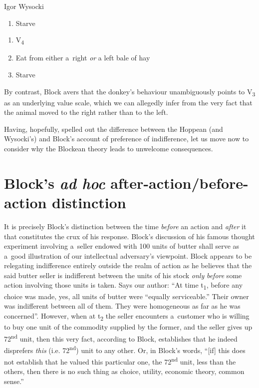 \begin{artengenv}{Igor Wysocki}
\begin{enumerate}[label=(\arabic*)]
\item Starve

\end{enumerate}

\begin{enumerate}[label=(\arabic*)]
\item[]\makebox[-1.7em][l]{}V\textsubscript{4}
\item Eat from either a~right \textit{or} a left bale of hay
\item Starve
\end{enumerate}

By contrast, Block avers that the donkey's behaviour unambiguously points to V\textsubscript{3} as an underlying value scale, which we can allegedly infer from the very fact that the animal moved to the right rather than to the left.



Having, hopefully, spelled out the difference between the Hoppean (and Wysocki's) and Block's account of preference of indifference, let us move now to consider why the Blockean theory leads to unwelcome consequences.



\section{Block's \textit{ad hoc} after-action/before-action distinction }

It is precisely Block's distinction between the time \textit{before} an action and \textit{after} it that constitutes the crux of his response. Block's 
\parencite*[][p.52]{block_response_2022} %
 discussion of his famous thought experiment involving a~seller endowed with 100 units of butter shall serve as a~good illustration of our intellectual adversary's viewpoint. Block appears to be relegating indifference entirely outside the realm of action as he believes that the said butter seller is indifferent between the units of his stock \textit{only} \textit{before} some action involving those units is taken. Says our author: ``At time t\textsubscript{1}, before any choice was made, yes, all units of butter were ``equally serviceable.'' Their owner was indifferent between all of them. They were homogeneous as far as he was concerned''. However, when at t\textsubscript{2} the seller encounters a~customer who is willing to buy one unit of the commodity supplied by the former, and the seller gives up 72\textsuperscript{nd }unit, then this very fact, according to Block, establishes that he indeed disprefers \textit{this} (i.e. 72\textsuperscript{nd}) unit to any other. Or, in Block's words, ``[if] this does not establish that he valued this particular one, the 72\textsuperscript{nd} unit, less than the others, then there is no such thing as choice, utility, economic theory, common sense.''




\end{artengenv}
